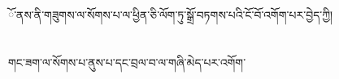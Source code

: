 ོ་ནས་ནི་གཟུགས་ལ་སོགས་པ་ལ་ཕྱིན་ཅི་ལོག་ཏུ་སྒྲོ་བཏགས་པའི་ངོ་བོ་འགོག་པར་བྱེད་ཀྱི།\chapter{ }གང་ཟག་ལ་སོགས་པ་ནུས་པ་དང་བྲལ་བ་ལ་གཞི་མེད་པར་འགོག་